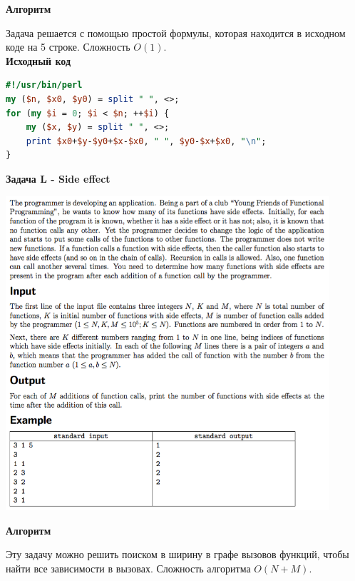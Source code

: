 \documentclass[a4paper,12pt]{article}
\begin{document}
\textbf{{\large Алгоритм}}

Задача решается с помощью простой формулы, которая находится в исходном коде на 5 строке. Сложность $O(1)$. \\

\textbf{{\large Исходный код}} \\
\begin{lstlisting}[language=Perl]
#!/usr/bin/perl
my ($n, $x0, $y0) = split " ", <>;
for (my $i = 0; $i < $n; ++$i) {
	my ($x, $y) = split " ", <>;
	print $x0+$y-$y0+$x-$x0, " ", $y0-$x+$x0, "\n";
}
\end{lstlisting}


\newpage
\textbf{{\large Задача L - Side effect}}

\begin{center}
\includegraphics[width=0.9\textwidth]{OC_Siberia/L.png}\\ [1cm]
\end{center}

\textbf{{\large Алгоритм}}

Эту задачу можно решить поиском в ширину в графе вызовов функций, чтобы найти все зависимости в вызовах. Сложность алгоритма $O(N + M)$. \\
\end{document}

